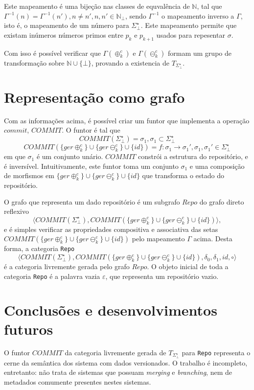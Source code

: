 \documentclass[a4paper]{article}
\newcommand{\co}{{$commit$}}
\newcommand{\baseset}{{\Sigma^\star_\bot}}
\newcommand{\opa}{{\oplus^c_k}}
\newcommand{\gopa}{{\{ger\opa\}}}
\newcommand{\opb}{{\ominus^c_k}}
\newcommand{\gopb}{{\{ger\opb\}}}
\newcommand{\transMon}{{T_\baseset}}
\newcommand{\composition}{{\circ}}
\newcommand{\morun}{{\gopa \cup \gopb \cup \{id\}}}
\begin{document}
Este mapeamento é uma bijeção nas classes de equvalência de $\mathbb{N}$, tal que $\Gamma^{-1}(n) = \Gamma^{-1}(n\prime), n \neq n\prime, n, n\prime \in \mathbb{N}_\bot$, sendo $\Gamma^{-1}$ o mapeamento inverso a $\Gamma$, isto é, o mapeamento de um número para $\baseset$. Este mapeamento permite que existam inúmeros números primos entre $p_k$ e $p_{k+1}$ usados para repesentar $\sigma$.

Com isso é possível verificar que $\Gamma(\opa)$ e $\Gamma(\opb)$ formam um grupo de transformação sobre $\mathbb{N} \cup \{\bot\}$, provando a existencia de $\transMon$.


\section*{Representação como grafo}
Com as informações acima, é possível criar um funtor que implementa a operação \co, $COMMIT$. O funtor é tal que
\begin{equation} \label{fun:set}
COMMIT(\baseset) = \sigma_1, \sigma_1 \subset \baseset
\end{equation}
\begin{equation} \label{fun:mor}
COMMIT(\morun) = f:\sigma_1 \to \sigma_1\prime, \sigma_1,\sigma_1\prime \in \baseset
\end{equation}
em que $\sigma_1$ é um conjunto unário. $COMMIT$ constrói a estrutura do repositório, e é inversível. Intuitivamente, este funtor toma um conjunto $\sigma_1$ e uma composição de morfismos em $\morun$ que transforma o estado do repositório. 

O grafo que representa um dado repositório é um subgrafo $Repo$ do grafo direto reflexivo
\[
\langle COMMIT(\baseset), COMMIT(\morun)\rangle,
\]
e é simples verificar as propriedades compositiva e associativa das setas $COMMIT(\morun)$ pelo mapeamento $\Gamma$ acima. Desta forma, a categoria {\tt Repo} 
 \[
\langle COMMIT(\baseset), COMMIT(\morun), \delta_0, \delta_1, id, \composition\rangle
\]
é a categoria livremente gerada pelo grafo $Repo$. O objeto inicial de toda a categoria {\tt Repo} é a palavra vazia $\varepsilon$, que representa um repositório vazio.

\section*{Conclusões e desenvolvimentos futuros}
O funtor $COMMIT$ da categoria livremente gerada de $\transMon$ para {\tt Repo} representa o cerne da semântica dos sistema com dados versionados. O trabalho é incompleto, entretanto: não trata de sistemas que possuam {\it merging} e {\it branching}, nem de metadados comumente presentes nestes sistemas.
\end{document}
